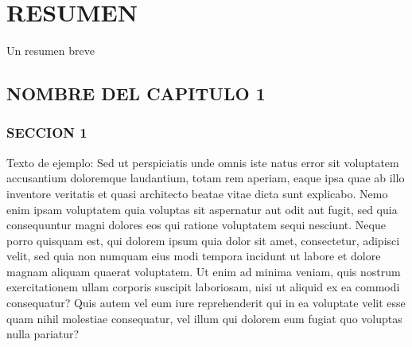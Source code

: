 \documentclass[12pt,reqno,oneside,pdftex]{formato-puc/puctesis} %
\begin{document}
\chapter*{RESUMEN}

Un resumen breve

\cleardoublepage %



\NoChapterPageNumber           %


\hypertarget{nombre-del-capitulo-1}{%
\section{NOMBRE DEL CAPITULO 1}\label{nombre-del-capitulo-1}}

\hypertarget{seccion-1}{%
\subsection{SECCION 1}\label{seccion-1}}

Texto de ejemplo: Sed ut perspiciatis unde omnis iste natus error sit
voluptatem accusantium doloremque laudantium, totam rem aperiam, eaque
ipsa quae ab illo inventore veritatis et quasi architecto beatae vitae
dicta sunt explicabo. Nemo enim ipsam voluptatem quia voluptas sit
aspernatur aut odit aut fugit, sed quia consequuntur magni dolores eos
qui ratione voluptatem sequi nesciunt. Neque porro quisquam est, qui
dolorem ipsum quia dolor sit amet, consectetur, adipisci velit, sed quia
non numquam eius modi tempora incidunt ut labore et dolore magnam
aliquam quaerat voluptatem. Ut enim ad minima veniam, quis nostrum
exercitationem ullam corporis suscipit laboriosam, nisi ut aliquid ex ea
commodi consequatur? Quis autem vel eum iure reprehenderit qui in ea
voluptate velit esse quam nihil molestiae consequatur, vel illum qui
dolorem eum fugiat quo voluptas nulla pariatur?
\end{document}
